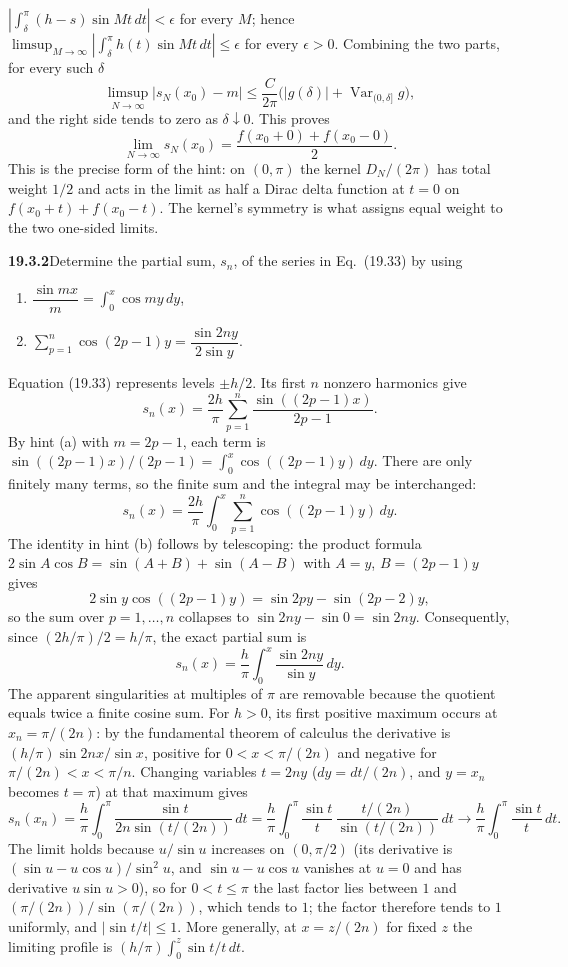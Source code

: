 $|\int_\delta^\pi(h-s)\sin Mt\,dt|<\epsilon$ for every $M$; hence
$\limsup_{M\to\infty}|\int_\delta^\pi h(t)\sin Mt\,dt|\le\epsilon$ for
every $\epsilon>0$. Combining the two parts, for every such $\delta$
\[
\limsup_{N\to\infty}|s_N(x_0)-m|
\le\frac{C}{2\pi}\bigl(|g(\delta)|+\operatorname{Var}_{(0,\delta]}g\bigr),
\]
and the right side tends to zero as $\delta\downarrow0$. This proves
\[
\boxed{\lim_{N\to\infty}s_N(x_0)
=\frac{f(x_0+0)+f(x_0-0)}2.}
\]
This is the precise form of the hint: on $(0,\pi)$ the kernel
$D_N/(2\pi)$ has total weight $1/2$ and acts in the limit as half a
Dirac delta function at $t=0$ on $f(x_0+t)+f(x_0-t)$. The kernel's
symmetry is what assigns equal weight to the two one-sided limits.

\par\bigskip
\noindent\textbf{19.3.2}\quad Determine the partial sum, $s_{n}$,
of the series in Eq.~(19.33) by using
\begin{enumerate}
\item[(a)] $\dfrac{\sin mx}{m}
=\displaystyle\int_{0}^{x}\cos my\,dy$,
\item[(b)] $\displaystyle\sum_{p=1}^{n}\cos(2p-1)y
=\dfrac{\sin 2ny}{2\sin y}$.
\end{enumerate}
\solution
Equation (19.33) represents levels $\pm h/2$. Its first $n$ nonzero
harmonics give
\[
s_n(x)=\frac{2h}{\pi}\sum_{p=1}^n
\frac{\sin((2p-1)x)}{2p-1}.
\]
By hint (a) with $m=2p-1$, each term is
$\sin((2p-1)x)/(2p-1)=\int_0^x\cos((2p-1)y)\,dy$. There are only
finitely many terms, so the finite sum and the integral may be
interchanged:
\[
s_n(x)=\frac{2h}{\pi}\int_0^x\sum_{p=1}^n\cos((2p-1)y)\,dy.
\]
The identity in hint (b) follows by telescoping: the product formula
$2\sin A\cos B=\sin(A+B)+\sin(A-B)$ with $A=y$, $B=(2p-1)y$ gives
\[
2\sin y\cos((2p-1)y)=\sin2py-\sin(2p-2)y,
\]
so the sum over $p=1,\ldots,n$ collapses to $\sin2ny-\sin0=\sin2ny$.
Consequently, since $(2h/\pi)/2=h/\pi$, the exact partial sum is
\[
\boxed{s_n(x)=\frac h\pi\int_0^x\frac{\sin2ny}{\sin y}\,dy.}
\]
The apparent singularities at multiples of $\pi$ are removable because
the quotient equals twice a finite cosine sum.
For $h>0$, its first positive maximum occurs at $x_n=\pi/(2n)$: by the
fundamental theorem of calculus the derivative is
$(h/\pi)\sin2nx/\sin x$, positive for $0<x<\pi/(2n)$ and negative for
$\pi/(2n)<x<\pi/n$. Changing variables $t=2ny$ ($dy=dt/(2n)$, and
$y=x_n$ becomes $t=\pi$) at that maximum gives
\[
s_n(x_n)=\frac h\pi\int_0^\pi
\frac{\sin t}{2n\sin(t/(2n))}\,dt
=\frac h\pi\int_0^\pi\frac{\sin t}{t}\,
\frac{t/(2n)}{\sin(t/(2n))}\,dt
\longrightarrow\frac h\pi\int_0^\pi\frac{\sin t}{t}\,dt.
\]
The limit holds because $u/\sin u$ increases on $(0,\pi/2)$ (its
derivative is $(\sin u-u\cos u)/\sin^2u$, and $\sin u-u\cos u$ vanishes
at $u=0$ and has derivative $u\sin u>0$), so for
$0<t\le\pi$ the last factor lies between $1$ and
$(\pi/(2n))/\sin(\pi/(2n))$, which tends to $1$; the factor therefore
tends to $1$ uniformly, and $|\sin t/t|\le1$.
More generally, at $x=z/(2n)$ for fixed $z$ the limiting profile is
$(h/\pi)\int_0^z\sin t/t\,dt$.

